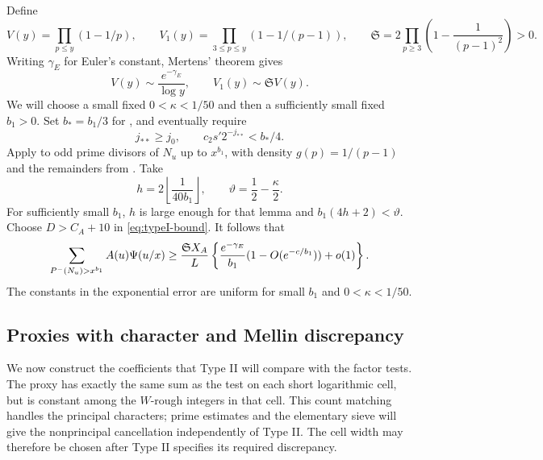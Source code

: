 Define
\[
 V(y)=\prod_{p\le y}(1-1/p),\qquad
 V_1(y)=\prod_{3\le p\le y}(1-1/(p-1)),\qquad
 \mathfrak S=2\prod_{p\ge3}\left(1-\frac1{(p-1)^2}\right)>0.
\]
Writing $\gamma_E$ for Euler's constant, Mertens' theorem gives
\begin{equation}\label{eq:sieve-products}
 V(y)\sim\frac{e^{-\gamma_E}}{\log y},\qquad
 V_1(y)\sim\mathfrak S V(y).
\end{equation}
We will choose a small fixed $0<\kappa<1/50$ and then a sufficiently
small fixed $b_1>0$. Set $b_*=b_1/3$ for , and
eventually require
\begin{equation}\label{eq:rough-slot-placement}
 j_{**}\ge j_0,\qquad c_2s'2^{-j_{**}}<b_*/4.
\end{equation}
Apply  to odd prime divisors of $N_u$ up to $x^{b_1}$,
with density $g(p)=1/(p-1)$ and the remainders from
. Take
\[
 h=2\left\lfloor\frac1{40b_1}\right\rfloor,
 \qquad \vartheta=\frac12-\frac\kappa2.
\]
For sufficiently small $b_1$, $h$ is large enough for that lemma and
$b_1(4h+2)<\vartheta$. Choose $D>C_A+10$ in
\eqref{eq:typeI-bound}. It follows that
\begin{equation}\label{eq:presieve-mass}
 \sum_{P^{-}(N_u)>x^{b_1}}A(u)\Psi(u/x)
 \ge \frac{\mathfrak S X_A}{L}
   \left\{\frac{e^{-\gamma_E}}{b_1}
                 (1-O(e^{-c/b_1}))+o(1)\right\}.
\end{equation}
The constants in the exponential error are uniform for small
$b_1$ and $0<\kappa<1/50$.

\subsection{Proxies with character and Mellin discrepancy}

We now construct the coefficients that Type II will compare with the
factor tests. The proxy has exactly the same sum as the test on each
short logarithmic cell, but is constant among the $W$-rough integers
in that cell. This count matching handles the principal
characters; prime estimates and the elementary sieve will give the
nonprincipal cancellation independently of Type II. The cell width may
therefore be chosen after Type II specifies its required discrepancy.

